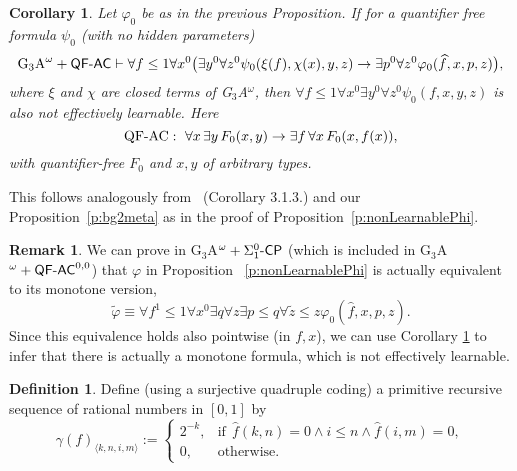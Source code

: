 \documentclass[1p]{elsarticle}
\newcommand{\usftext}[1]{\textsf{\upshape #1}}
\newcommand{\CP}{\ensuremath{\usftext{CP}}}
\newcommand{\QF}{\ensuremath{\usftext{QF}}}
\newcommand{\AC}{\ensuremath{\usftext{AC}}}
\newcommand{\SiLm}{\ensuremath{\Sigma^0_1\usftext{-}}}
\newcommand{\m}{\ensuremath{\usftext{-}}}
\newcommand{\Tif}{\text{if}\ }
\newcommand{\Telse}{\text{otherwise}}
\theoremstyle{plain}
\newtheorem{cor}[thm]{Corollary}
\theoremstyle{definition}
\newtheorem{dfn}[thm]{Definition}
\newtheorem{rmk}[thm]{Remark}
\theoremstyle{remark}
\renewenvironment{proof}[1][]{\noindent{\bf Proof{#1}. }}{\nopagebreak[4]{\hspace*{\fill}
  $\Box$              %
 }{\vspace{2ex}}}
\renewcommand{\phi}{\varphi}
\theoremstyle{definition}
\begin{document}
{\begin{cor}\label{c:anyStrongerPhi}
Let $\phi_0$ be as in the previous Proposition. If for a quantifier free formula $\psi_0$ (with no hidden parameters)
\[
\mbox{\rm G$_3$A}^\omega+\QF\m\AC 
\vdash \forall f\leq 1 \forall x^0\big( \exists y^0\forall z^0 \psi_0(\xi(f),\chi(x),y,z)
 \rightarrow \exists p^0\forall z^0 \phi_0(\widehat{f},x,p,z) \big),
\]
where $\xi$ and $\chi$ are closed terms of {\rm G$_3$A$^\omega$,}
then $\forall f\leq 1\forall x^0\exists y^0\forall z^0 \psi_0(f,x,y,z)$ is also not effectively learnable. Here 
\[ \mbox{\rm QF-AC}: \ \forall x\,\exists y\,F_0(x,y)\rightarrow 
\exists f\,\forall x\,F_0(x,f(x)), \] 
with quantifier-free $F_0$ and $x,y$ of arbitrary types.
\end{cor}
\begin{proof}
This follows analogously from~\cite{Kohlenbach(lowrate)} (Corollary 3.1.3.) 
and our Proposition~\ref{p:bg2meta} as in the proof
of Proposition~\ref{p:nonLearnablePhi}.
\end{proof}

\begin{rmk}
We can prove in {\rm G$_3$A$^\omega+\SiLm\CP$} (which is included in 
{\rm G$_3$A$^\omega+\QF\m\AC^{0,0}$}) that $\phi$ in Proposition
~\ref{p:nonLearnablePhi} is actually equivalent to its monotone version, 
\[
\tilde\phi\equiv \forall f^1\leq 1\forall x^0\exists q\forall z \exists 
p\leq q\forall \tilde z\leq z \phi_0(\widehat{f},x,p,z).
\]
Since this equivalence holds also pointwise (in $f,x$), 
we can use Corollary \ref{c:anyStrongerPhi} to 
infer that there is actually a monotone formula, which is not effectively 
learnable.
\end{rmk}

\begin{dfn}\label{d:gammaf} Define (using a surjective quadruple coding) a 
primitive recursive sequence of rational numbers in $[0,1]$ by
\[
\gamma(f)_{\langle k,n,i,m\rangle}:=\begin{cases}
2^{-k},&\Tif\ \widehat{f}(k,n)=0\wedge i\leq n\wedge \widehat{f}(i,m)=0,\\
0,&\Telse.\end{cases}
\]
\end{dfn}

}
\end{document}
